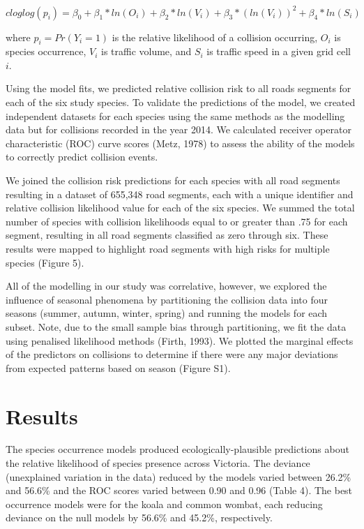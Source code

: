 \begin{equation}
cloglog(p_i) = \beta_0 + \beta_1*ln(O_i) + \beta_2*ln(V_i) + \beta_3*(ln(V_i))^2 + \beta_4*ln(S_i)
\end{equation}

\noindent where $p_i=Pr(Y_i=1)$ is the relative likelihood of a collision occurring, $O_i$ is species occurrence, $V_i$ is traffic volume, and $S_i$ is traffic speed in a given grid cell $i$.

Using the model fits, we predicted relative collision risk to all roads segments for each of the six study species.  To validate the predictions of the model, we created independent datasets for each species using the same methods as the modelling data but for collisions recorded in the year 2014.  We calculated receiver operator characteristic (ROC) curve scores (Metz, 1978) to assess the ability of the models to correctly predict collision events.

We joined the collision risk predictions for each species with all road segments resulting in a dataset of 655,348 road segments, each with a unique identifier and relative collision likelihood value for each of the six species.  We summed the total number of species with collision likelihoods equal to or greater than .75 for each segment, resulting in all road segments classified as zero through six.  These results were mapped to highlight road segments with high risks for multiple species (Figure 5).

All of the modelling in our study was correlative, however, we explored the influence of seasonal phenomena by partitioning the collision data into four seasons (summer, autumn, winter, spring) and running the models for each subset. Note, due to the small sample bias through partitioning, we fit the data using penalised likelihood methods (Firth, 1993).  We plotted the marginal effects of the predictors on collisions to determine if there were any major deviations from expected patterns based on season (Figure S1).

\section{Results}

The species occurrence models produced ecologically-plausible predictions about the relative likelihood of species presence across Victoria. The deviance (unexplained variation in the data) reduced by the models varied between 26.2\% and 56.6\% and the ROC scores varied between 0.90 and 0.96 (Table 4). The best occurrence models were for the koala and common wombat, each reducing deviance on the null models by 56.6\% and 45.2\%, respectively. 

